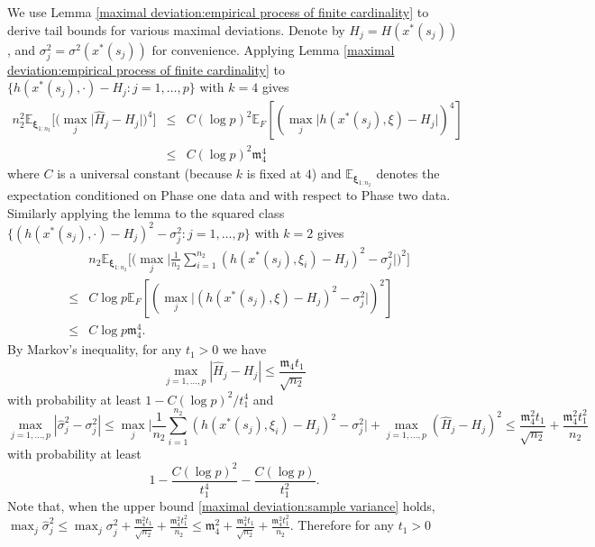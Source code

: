 \documentclass[mnsc,blindrev]{informs4} %
\newcommand{\abs}[1]{\left \vert #1 \right\vert}
\begin{document}
We use Lemma \ref{maximal deviation:empirical process of finite cardinality} to derive tail bounds for various maximal deviations. Denote by $H_j = H(x^*(s_j))$, and $\sigma^2_j=\sigma^2(x^*(s_j))$ for convenience. Applying Lemma \ref{maximal deviation:empirical process of finite cardinality} to $\{h(x^*(s_j),\cdot)-H_j:j=1,\ldots,p\}$ with $k=4$ gives
\begin{eqnarray*}
    n_2^2\mathbb E_{\bm{\xi}_{1:n_2}}\big[\big(\max_{j}\big\lvert\hat H_j-H_j\big\rvert\big)^4\big]&\leq& C(\log p)^2\mathbb E_F[(\max_{j}\lvert h(x^*(s_j),\xi)-H_j\rvert)^4]\\
    &\leq &C(\log p)^2\mathfrak{m}_4^4
\end{eqnarray*}
where $C$ is a universal constant (because $k$ is fixed at $4$) and $\mathbb E_{\bm{\xi}_{1:n_2}}$ denotes the expectation conditioned on Phase one data and with respect to Phase two data. Similarly applying the lemma to the squared class $\{(h(x^*(s_j),\cdot)-H_j)^2-\sigma^2_j:j=1,\ldots,p\}$ with $k=2$ gives
\begin{eqnarray*}
    &&n_2\mathbb E_{\bm{\xi}_{1:n_2}}\big[\big(\max_{j}\big\lvert\frac{1}{n_2}\sum_{i=1}^{n_2}(h(x^*(s_j),\xi_i)-H_j)^2-\sigma^2_j\big\rvert\big)^2\big]\\
    &\leq& C\log p\mathbb E_F[(\max_{j}\lvert (h(x^*(s_j),\xi)-H_j)^2-\sigma^2_j\rvert)^2]\\
    &\leq &C\log p\mathfrak{m}_4^4.
\end{eqnarray*}
By Markov's inequality, for any $t_1>0$ we have
\begin{equation*}
    \max_{j=1,\ldots,p}\abs{\hat H_j-H_j}\leq\frac{\mathfrak{m}_4t_1}{\sqrt{n_2}}
\end{equation*}
with probability at least $1-C(\log p)^2/t_1^4$ and
\begin{equation}\label{maximal deviation:sample variance}
    \max_{j=1,\ldots,p}\abs{\hat \sigma^2_j-\sigma^2_j}\leq \max_{j}\big\lvert\frac{1}{n_2}\sum_{i=1}^{n_2}(h(x^*(s_j),\xi_i)-H_j)^2-\sigma^2_j\big\rvert+\max_{j=1,\ldots,p}(\hat H_j-H_j)^2\leq\frac{\mathfrak{m}_4^2t_1}{\sqrt{n_2}}+\frac{\mathfrak{m}_4^2t_1^2}{n_2}
\end{equation}
with probability at least
\begin{equation*}
1-\frac{C(\log p)^2}{t_1^4}-\frac{C(\log p)}{t_1^2}.
\end{equation*}
Note that, when the upper bound \eqref{maximal deviation:sample variance} holds, $\max_j\hat \sigma^2_j\leq \max_{j}\sigma^2_j+\frac{\mathfrak{m}_4^2t_1}{\sqrt{n_2}}+\frac{\mathfrak{m}_4^2t_1^2}{n_2}\leq \mathfrak{m}_4^2+\frac{\mathfrak{m}_4^2t_1}{\sqrt{n_2}}+\frac{\mathfrak{m}_4^2t_1^2}{n_2}$. Therefore for any $t_1>0$
\end{document}
